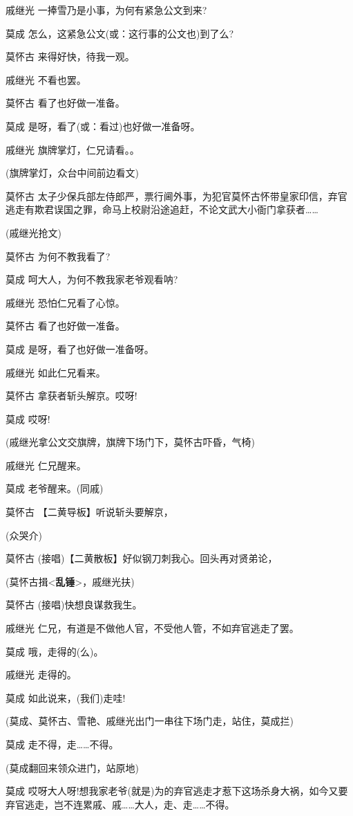 戚继光 一捧雪乃是小事，为何有紧急公文到来?

莫成 怎么，这紧急公文(或：这行事的公文也)到了么?

莫怀古 来得好快，待我一观。

戚继光 不看也罢。

莫怀古 看了也好做一准备。

莫成 是呀，看了(或：看过)也好做一准备呀。

戚继光 旗牌掌灯，仁兄请看。。

(旗牌掌灯，众台中间前边看文)

莫怀古
太子少保兵部左侍郎严，票行阃外事，为犯官莫怀古怀带皇家印信，弃官逃走有欺君误国之罪，命马上校尉沿途追赶，不论文武大小衙门拿获者\ldots{}\ldots{}

(戚继光抢文)

莫怀古 为何不教我看了?

莫成 呵大人，为何不教我家老爷观看呐?

戚继光 恐怕仁兄看了心惊。

莫怀古 看了也好做一准备。

莫成 是呀，看了也好做一准备呀。

戚继光 如此仁兄看来。

莫怀古 拿获者斩头解京。哎呀!

莫成 哎呀!

(戚继光拿公文交旗牌，旗牌下场门下，莫怀古吓昏，气椅)

戚继光 仁兄醒来。

莫成 老爷醒来。(同戚)

莫怀古 【二黄导板】听说斩头要解京，

(众哭介)

莫怀古 (接唱)【二黄散板】好似钢刀刺我心。回头再对贤弟论，

(莫怀古揖\textless{}\textbf{乱锤}\textgreater{}，戚继光扶)

莫怀古 (接唱)快想良谋救我生。

戚继光 仁兄，有道是不做他人官，不受他人管，不如弃官逃走了罢。

莫成 哦，走得的(么)。

戚继光 走得的。

莫成 如此说来，(我们)走哇!

(莫成、莫怀古、雪艳、戚继光出门一串往下场门走，站住，莫成拦)

莫成 走不得，走\ldots{}\ldots{}不得。

(莫成翻回来领众进门，站原地)

莫成
哎呀大人呀!想我家老爷(就是)为的弃官逃走才惹下这场杀身大祸，如今又要弃官逃走，岂不连累戚、戚\ldots{}\ldots{}大人，走、走\ldots{}\ldots{}不得。

